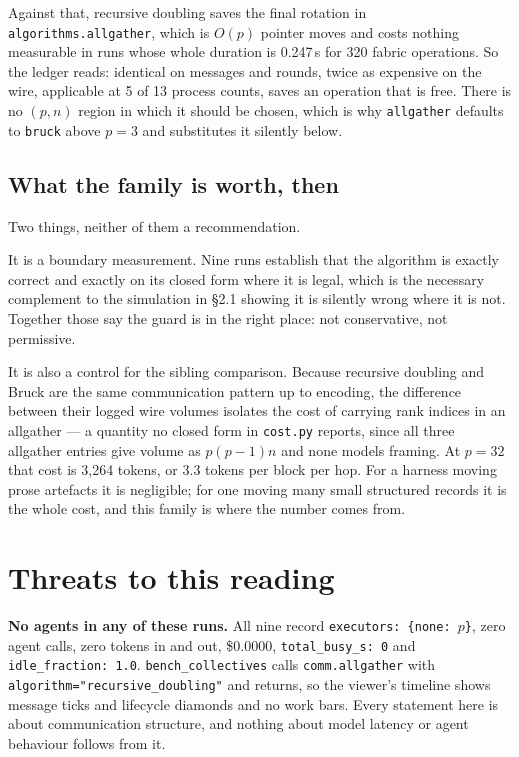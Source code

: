 \documentclass[11pt]{article}
\begin{document}
Against that, recursive doubling saves the final rotation in \texttt{algorithms.allgather}, which
is $O(p)$ pointer moves and costs nothing measurable in runs whose whole duration is 0.247\,s for
320 fabric operations. So the ledger reads: identical on messages and rounds, twice
as expensive on the wire, applicable at 5 of 13 process counts, saves an operation that is free.
There is
no $(p, n)$ region in which it should be chosen, which is why \texttt{allgather} defaults to
\texttt{bruck} above $p=3$ and substitutes it silently below.

\subsection{What the family is worth, then}

Two things, neither of them a recommendation.

It is a boundary measurement. Nine runs establish that the algorithm is exactly correct and
exactly on its closed form where it is legal, which is the necessary complement to the
simulation in \S2.1 showing it is silently wrong where it is not. Together those say the guard is
in the right place: not conservative, not permissive.

It is also a control for the sibling comparison. Because recursive doubling and Bruck are the same
communication pattern up to encoding, the difference between their logged wire volumes isolates
the cost of carrying rank indices in an allgather --- a quantity no closed form in
\texttt{cost.py} reports, since all three allgather entries give volume as $p(p-1)n$ and none
models framing. At $p=32$ that cost is 3{,}264 tokens, or 3.3 tokens per block per hop. For a
harness moving prose artefacts it is negligible; for one moving many small structured records it
is the whole cost, and this family is where the number comes from.

\section{Threats to this reading}

\textbf{No agents in any of these runs.} All nine record \texttt{executors: \{none: $p$\}}, zero
agent calls, zero tokens in and out, \$0.0000, \texttt{total\_busy\_s: 0} and
\texttt{idle\_fraction: 1.0}. \texttt{bench\_collectives} calls \texttt{comm.allgather} with
\texttt{algorithm="recursive\_doubling"} and returns, so the viewer's timeline shows message
ticks and lifecycle diamonds and no work bars. Every statement
here is about communication structure, and nothing about model latency or agent behaviour follows
from it.
\end{document}
